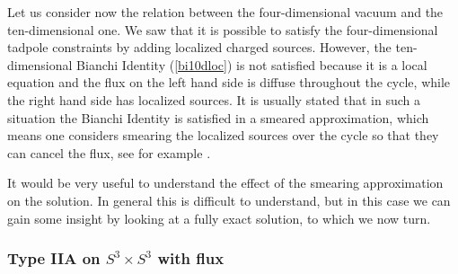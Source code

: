 \documentclass[11pt,a4paper]{article}
\numberwithin{equation}{section}
\numberwithin{table}{section}\setlength{\multlinegap}{25pt}
\begin{document}
Let us consider now the relation between the four-dimensional vacuum and the ten-dimensional one. We saw that it is possible to satisfy the four-dimensional tadpole constraints by adding localized charged sources. However, the ten-dimensional Bianchi Identity (\ref{bi10dloc}) is not satisfied because it is a local equation and the flux on the left hand side is diffuse throughout the cycle, while the right hand side has localized sources. It is usually stated that in such a situation the Bianchi Identity is satisfied in a smeared approximation, which means one considers smearing the localized sources over the cycle so that they can cancel the flux, see for example \cite{Grana:2006kf}. 

It would be very useful to understand the effect of the smearing approximation on the solution. In general this is difficult to understand, but in this case we can gain some insight by looking at a fully exact solution, to which we now turn.

\subsubsection{Type IIA on $S^3 \times S^3$ with flux}
\label{sec:iias3s3}
\end{document}
